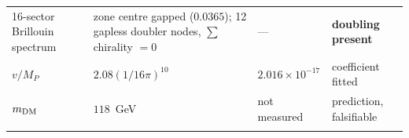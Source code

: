 \documentclass[aps,prd,amsmath,amssymb,superscriptaddress,longbibliography,floatfix,preprint]{revtex4-2}
\begin{document}
{\begin{longtable}{llll}
\parbox[c]{2.63cm}{\vspace{2.5pt}\raggedright {} 16-sector Brillouin spectrum\vspace{2.5pt}} & \parbox[c]{4.21cm}{\vspace{2.5pt}\raggedright {} zone centre gapped (\mbox{$0.0365$}); 12 gapless doubler nodes, \mbox{$\sum$} chirality \mbox{$= 0$}\vspace{2.5pt}} & \parbox[c]{3.01cm}{\vspace{2.5pt}\raggedright {} ---\vspace{2.5pt}} & \parbox[c]{4.8cm}{\vspace{2.5pt}\raggedright {} \textbf{doubling present}\vspace{2.5pt}} \\
\hline{}
\parbox[c]{2.63cm}{\vspace{2.5pt}\raggedright {} \mbox{$v/M_P$}\vspace{2.5pt}} & \parbox[c]{4.21cm}{\vspace{2.5pt}\raggedright {} \mbox{$2.08(1/16\pi)^{10}$}\vspace{2.5pt}} & \parbox[c]{3.01cm}{\vspace{2.5pt}\raggedright {} \mbox{$2.016\times10^{-17}$}\vspace{2.5pt}} & \parbox[c]{4.8cm}{\vspace{2.5pt}\raggedright {} coefficient fitted\vspace{2.5pt}} \\
\hline{}
\parbox[c]{2.63cm}{\vspace{2.5pt}\raggedright {} \mbox{$m_{\rm DM}$}\vspace{2.5pt}} & \parbox[c]{4.21cm}{\vspace{2.5pt}\raggedright {} \mbox{$118$ GeV}\vspace{2.5pt}} & \parbox[c]{3.01cm}{\vspace{2.5pt}\raggedright {} not measured\vspace{2.5pt}} & \parbox[c]{4.8cm}{\vspace{2.5pt}\raggedright {} prediction, falsifiable\vspace{2.5pt}} \\
\hline{}

\end{longtable}}
\end{document}
